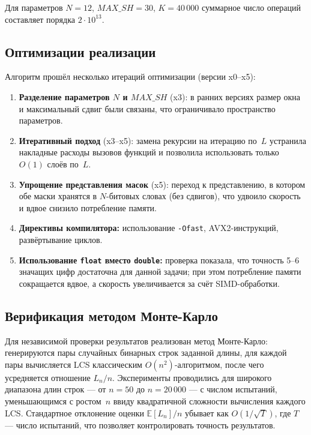 \documentclass[12pt,a4paper]{article}
\begin{document}
Для параметров $N = 12$, $\mathit{MAX\_SH} = 30$, $K = 40\,000$ суммарное число операций составляет порядка $2 \cdot 10^{13}$.

\subsection{Оптимизации реализации}

Алгоритм прошёл несколько итераций оптимизации (версии x0--x5):

\begin{enumerate}
  \item \textbf{Разделение параметров $N$ и $\mathit{MAX\_SH}$} (x3): в ранних версиях размер окна и максимальный сдвиг были связаны, что ограничивало пространство параметров.
  \item \textbf{Итеративный подход} (x3--x5): замена рекурсии на итерацию по~$L$ устранила накладные расходы вызовов функций и позволила использовать только~$O(1)$ слоёв по~$L$.
  \item \textbf{Упрощение представления масок} (x5): переход к представлению, в котором обе маски хранятся в $N$-битовых словах (без сдвигов), что удвоило скорость и вдвое снизило потребление памяти.
  \item \textbf{Директивы компилятора:} использование \texttt{-Ofast}, AVX2-инструкций, развёртывание циклов.
  \item \textbf{Использование \texttt{float} вместо \texttt{double}:} проверка показала, что точность 5--6 значащих цифр достаточна для данной задачи; при этом потребление памяти сокращается вдвое, а скорость увеличивается за счёт SIMD-обработки.
\end{enumerate}

\subsection{Верификация методом Монте-Карло}

Для независимой проверки результатов реализован метод Монте-Карло: генерируются пары случайных бинарных строк заданной длины, для каждой пары вычисляется LCS классическим $O(n^2)$-алгоритмом, после чего усредняется отношение $L_n / n$.
Эксперименты проводились для широкого диапазона длин строк --- от $n = 50$ до $n = 20\,000$ --- с числом испытаний, уменьшающимся с ростом~$n$ ввиду квадратичной сложности вычисления каждого LCS.
Стандартное отклонение оценки $\mathbb{E}[L_n]/n$ убывает как $O(1/\sqrt{T})$, где $T$ --- число испытаний, что позволяет контролировать точность результатов.
\end{document}

